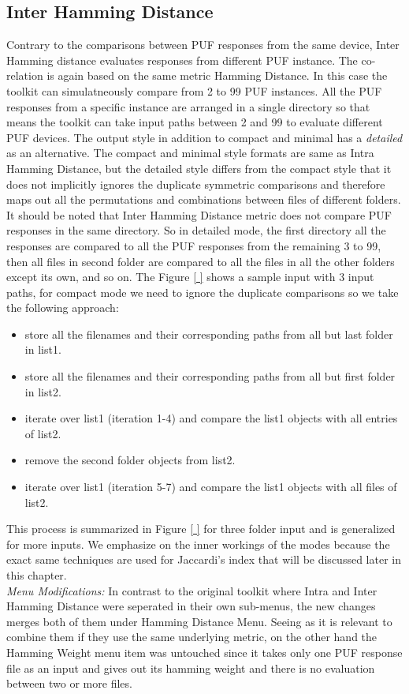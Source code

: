 \subsection{Inter Hamming Distance}
Contrary to the comparisons between PUF responses from the same device, Inter Hamming distance evaluates responses from different PUF instance. The co-relation is again based on the same metric Hamming Distance. In this case the toolkit can simulatneously compare from 2 to 99 PUF instances. All the PUF responses from a specific instance are arranged in a single directory so that means the toolkit can take input paths between 2 and 99 to evaluate different PUF devices. The output
style in addition to compact and minimal has a \emph{detailed} as an alternative. The compact and minimal style formats are same as Intra Hamming Distance, but the detailed style differs from the compact style that it does not implicitly ignores the duplicate symmetric comparisons and therefore maps out all the permutations and combinations between files of different folders. It should be noted that Inter Hamming Distance metric does not compare PUF responses in the same directory. So
in detailed mode, the first directory all the responses are compared to all the PUF responses from the remaining 3 to 99, then all files in second folder are compared to all the files in all the other folders except its own, and so on. The Figure \ref{ } shows a sample input with 3 input paths, for compact mode we need to ignore the duplicate comparisons so we take the following approach:
\begin{itemize}
	\item store all the filenames and their corresponding paths from all but last folder in list1.
	\item store all the filenames and their corresponding paths from all but first folder in list2.
	\item iterate over list1 (iteration 1-4) and compare the list1 objects with all entries of list2.
	\item remove the second folder objects from list2.
	\item iterate over list1 (iteration 5-7) and compare the list1 objects with all files of list2.
\end{itemize}

This process is summarized in Figure \ref{ } for three folder input and is generalized for more inputs. We emphasize on the inner workings of the modes because the exact same techniques are used for Jaccardi's index that will be discussed later in this chapter.\\

\emph{Menu Modifications:} In contrast to the original toolkit where Intra and Inter Hamming Distance were seperated in their own sub-menus, the new changes merges both of them under Hamming Distance Menu. Seeing as it is relevant to combine them if they use the same underlying metric, on the other hand the Hamming Weight menu item was untouched since it takes only one PUF response file as an input and gives out its hamming weight and there is no evaluation between two or
more files.\\

